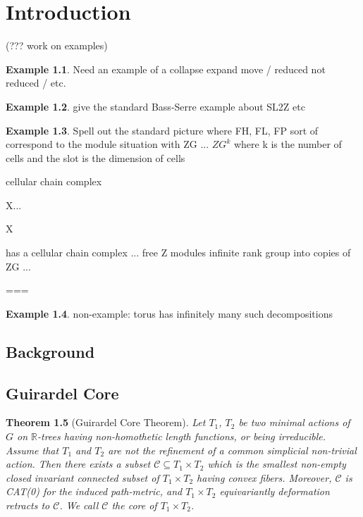 \documentclass[12pt,parskip=full]{report}
\theoremstyle{plain}
\newtheorem{thm}{Theorem}[section]
\theoremstyle{definition}
\newtheorem{exa}[thm]{Example}
\begin{document}


\chapter{Introduction}
\label{sect:intro}

(??? work on examples)
\begin{exa}
Need an example of a collapse expand move / reduced not reduced / etc.
\end{exa}

\begin{exa}
give the standard Bass-Serre example about SL2Z etc
\end{exa}

\begin{exa}
Spell out the standard picture where FH, FL, FP sort of correspond to the module situation with ZG ... \(ZG^k\) where k is the number of cells and the slot is the dimension of cells

cellular chain complex

X...

X~

has a cellular chain complex ... free Z modules infinite rank
group into copies of ZG ...



===






\end{exa}

\begin{exa}
non-example: torus has infinitely many such decompositions
\end{exa}



\section{Background}

\section{Guirardel Core}

\begin{thm}
    [Guirardel Core Theorem]
    \label{thm:guirardelcore}
    Let \(T_1\), \(T_2\) be two minimal actions of \(G\) on \(\mathbb{R}\)-trees having non-homothetic length functions, or being irreducible. Assume that \(T_1\) and \(T_2\) are not the refinement of a common simplicial non-trivial action. Then there exists a subset \(\mathscr{C}\subseteq T_1\times T_2\) which is the smallest non-empty closed invariant connected subset of \(T_1\times T_2\) having convex fibers. Moreover, \(\mathscr{C}\) is CAT(0) for the induced path-metric, and \(T_1\times T_2\) equivariantly deformation retracts to \(\mathscr{C}\). We call \(\mathscr{C}\) the core of \(T_1\times T_2\).
\end{thm}
\end{document}
